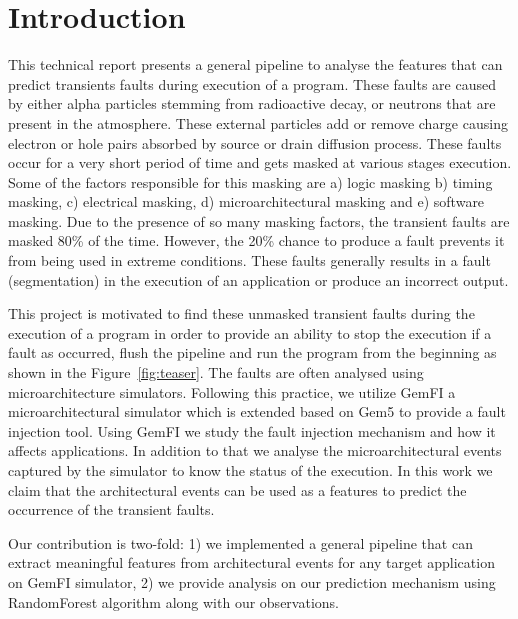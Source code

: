 \section{Introduction}
This technical report presents a general pipeline to analyse the features that can predict transients faults during execution of a program. These faults are caused by either alpha particles stemming from radioactive decay, or neutrons that are present in the atmosphere. These external particles add or remove charge causing electron or hole pairs absorbed by source or drain diffusion process. These faults occur for a very short period of time and gets masked at various stages execution. Some of the factors responsible for this masking are a) logic masking b) timing masking, c) electrical masking, d) microarchitectural masking and e) software masking. Due to the presence of so many masking factors, the transient faults are masked 80\% of the time. However, the 20\% chance to produce a fault prevents it from being used in extreme conditions. These faults generally results in a fault (segmentation) in the execution of an application or produce an incorrect output.

This project is motivated to find these unmasked transient faults during the execution of a program in order to provide an ability to stop the execution if a fault as occurred, flush the pipeline and run the program from the beginning as shown in the Figure~\ref{fig:teaser}. The faults are often analysed using microarchitecture simulators. Following this practice, we utilize GemFI \cite{parasyris2014gemfi} a microarchitectural simulator which is extended based on Gem5 \cite{Binkert:2011:GS:2024716.2024718} to provide a fault injection tool. Using GemFI we study the fault injection mechanism and how it affects applications. In addition to that we analyse the microarchitectural events captured by the simulator to know the status of the execution. In this work we claim that the architectural events can be used as a features to predict the occurrence of the transient faults.

Our contribution is two-fold: 1) we implemented a general pipeline that can extract meaningful features from architectural events for any target application on GemFI simulator, 2) we provide analysis on our prediction mechanism using RandomForest \cite{breiman2001random} algorithm along with our observations.

